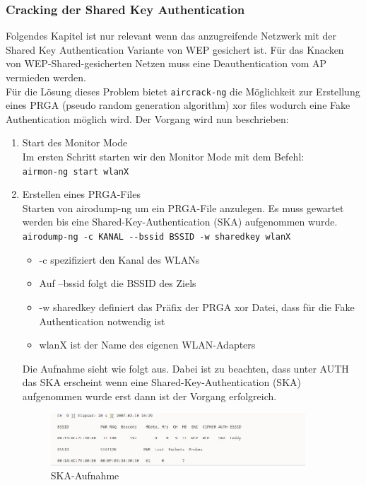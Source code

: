 	\subsubsection{Cracking der Shared Key Authentication}
	Folgendes Kapitel ist nur relevant wenn das anzugreifende Netzwerk mit der Shared Key Authentication Variante von WEP gesichert ist. Für das Knacken von WEP-Shared-gesicherten Netzen muss eine Deauthentication vom AP vermieden werden. \\
	Für die Lösung dieses Problem bietet \colorbox{altgray}{\lstinline|aircrack-ng|} die Möglichkeit zur Erstellung eines PRGA (pseudo random generation algorithm) xor files wodurch eine Fake Authentication möglich wird. Der Vorgang wird nun beschrieben:

	\begin{enumerate}
		\item Start des Monitor Mode \\
		 Im ersten Schritt starten wir den Monitor Mode mit dem Befehl: \\ \colorbox{altgray}{\lstinline|airmon-ng start wlanX|}

		\item Erstellen eines PRGA-Files \\
		Starten von airodump-ng um ein PRGA-File anzulegen. Es muss gewartet werden bis eine Shared-Key-Authentication (SKA) aufgenommen wurde.\\
		\colorbox{altgray}{\lstinline|airodump-ng -c KANAL --bssid BSSID -w sharedkey wlanX|} \\
		\begin{itemize}
			\item -c spezifiziert den Kanal des WLANs
			\item Auf --bssid folgt die BSSID des Ziels
			\item -w sharedkey definiert das Präfix der PRGA xor Datei, dass für die Fake Authentication notwendig ist

			\item wlanX ist der Name des eigenen WLAN-Adapters
		\end{itemize}
		Die Aufnahme sieht wie folgt aus. Dabei ist zu beachten, dass unter AUTH das SKA erscheint wenn eine Shared-Key-Authentication (SKA) aufgenommen wurde erst dann ist der Vorgang erfolgreich.
		\begin{figure}[H]
			\centering
			\includegraphics[width=0.9\textwidth]{images/WLAN/beispielSKA.JPG}
			\caption{SKA-Aufnahme}
			\label{fig:SKA-Aufnahme}
		\end{figure}


\end{enumerate}

